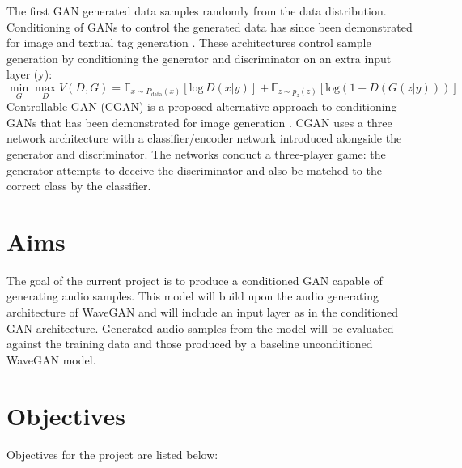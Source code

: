 \documentclass[a4paper, dvipsnames, titlepage]{article}
\begin{document}
The first GAN generated data samples randomly from the data distribution.
Conditioning of GANs to control the generated data has since been demonstrated for image and textual tag generation \citep{2014arXiv1411.1784M}.
These architectures control sample generation by conditioning the generator and discriminator on an extra input layer (y):
\newline
%
\begin{equation}
  \min_{G} \max_{D} V(D,G) = \mathbb{E}_{x \sim P_\mathrm{data}(x)}[\mathrm{log}\,D(x|y)] + \mathbb{E}_{z \sim p_z(z)}[\mathrm{log} (1 - D(G(z|y)))]
\end{equation}
%
\newline
Controllable GAN (CGAN) is a proposed alternative approach to conditioning GANs that has been demonstrated for image generation \citep{2017arXiv170800598L}.
CGAN uses a three network architecture with a classifier/encoder network introduced alongside the generator and discriminator.
The networks conduct a three-player game: the generator attempts to deceive the discriminator and also be matched to the correct class by the classifier.

\newpage

\section{Aims}

The goal of the current project is to produce a conditioned GAN capable of generating audio samples.
This model will build upon the audio generating architecture of WaveGAN and will include an input layer as in the conditioned GAN architecture.
Generated audio samples from the model will be evaluated against the training data and those produced by a baseline unconditioned WaveGAN model.

\newpage

\section{Objectives}

Objectives for the project are listed below:
\newline
\end{document}
